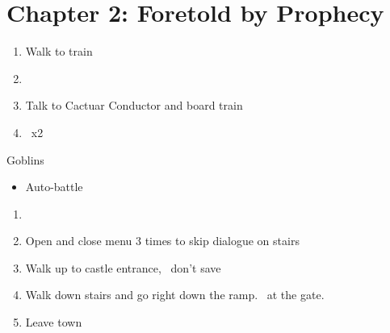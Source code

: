 \chapter{Chapter 2: Foretold by Prophecy}
\begin{enumerate}
	\item Walk to train
	\item \cs\
	\item Talk to Cactuar Conductor and board train
	\item \cs\ x2
\end{enumerate}
\begin{battle}[]{Goblins}
	\begin{itemize}
		\item Auto-battle
	\end{itemize}
\end{battle}
\begin{enumerate}[resume]
	\item \cs
	\item Open and close menu 3 times to skip dialogue on stairs
	\item Walk up to castle entrance, \cs\, don't save
	\item Walk down stairs and go right down the ramp. \cs\ at the gate.
	\item Leave town
\end{enumerate}